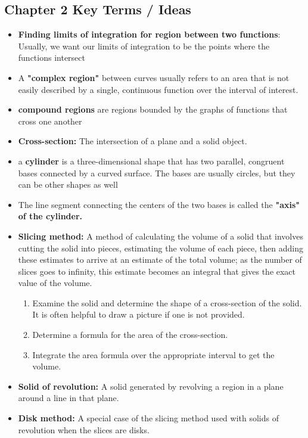 \documentclass{report}
\begin{document}
    \subsection{Chapter 2 Key Terms / Ideas}
    \bigbreak \noindent 
    \begin{itemize}
        \item \textbf{Finding limits of integration for region between two functions}: Usually, we want our limits of integration to be the points where the functions intersect
        \item A \textbf{"complex region"} between curves usually refers to an area that is not easily described by a single, continuous function over the interval of interest.
        \item \textbf{compound regions} are regions bounded by the graphs of functions that cross one another
        \item \textbf{Cross-section:} The intersection of a plane and a solid object.
        \item a \textbf{cylinder} is a three-dimensional shape that has two parallel, congruent bases connected by a curved surface. The bases are usually circles, but they can be other shapes as well
        \item The line segment connecting the centers of the two bases is called the \textbf{"axis" of the cylinder.}
        \item \textbf{Slicing method:} A method of calculating the volume of a solid that involves cutting the solid into pieces, estimating the volume of each piece, then adding these estimates to arrive at an estimate of the total volume; as the number of slices goes to infinity, this estimate becomes an integral that gives the exact value of the volume.
        \begin{enumerate}
            \item Examine the solid and determine the shape of a cross-section of the solid. It is often helpful to draw a picture if one is not provided.
            \item Determine a formula for the area of the cross-section.
            \item Integrate the area formula over the appropriate interval to get the volume.
        \end{enumerate}
        \item \textbf{Solid of revolution:} A solid generated by revolving a region in a plane around a line in that plane.
        \item \textbf{Disk method:} A special case of the slicing method used with solids of revolution when the slices are disks.

\end{itemize}
\end{document}

